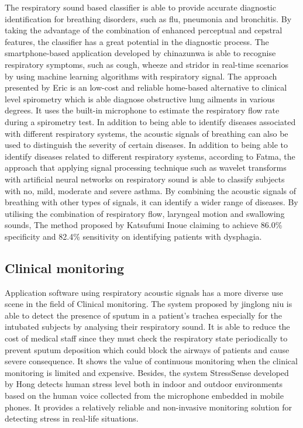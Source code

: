 The respiratory sound based classifier is able to provide accurate diagnostic identification for breathing disorders, such as flu, pneumonia and bronchitis. By taking the advantage of the combination of enhanced perceptual and cepstral features, the classifier has a great potential in the diagnostic process.\cite{Lei2014Content-basedFeatures} The smartphone-based application developed by chinazunwa is able to recognise respiratory symptoms, such as cough, wheeze and stridor in real-time scenarios by using machine learning algorithms with respiratory signal.\cite{Uwaoma2017OnAlgorithms} The approach presented by Eric is an low-cost and reliable home-based alternative to clinical level spirometry which is able diagnose obstructive lung ailments in various degrees. It uses the built-in microphone to estimate the respiratory flow rate during a spirometry test.\cite{Boriello2012SpiroSmart} In addition to being able to identify diseases associated with different respiratory systems, the acoustic signals of breathing can also be used to distinguish the severity of certain diseases. In addition to being able to identify diseases related to different respiratory systems, according to Fatma, the approach that applying signal processing technique such as wavelet transforms with artificial neural networks on respiratory sound is able to classify subjects with no, mild, moderate and severe asthma.\cite{Gogus2015ClassificationNetworks} By combining the acoustic signals of breathing with other types of signals, it can identify a wider range of diseases. By utilising the combination of respiratory flow, laryngeal motion and swallowing sounds, The method proposed by Katsufumi Inoue claiming to achieve 86.0\% specificity and 82.4\% sensitivity on identifying patients with dysphagia.\cite{Oku2018UsingSwallowing}


\subsection{Clinical monitoring}
Application software using respiratory acoustic signals has a more diverse use scene in the field of Clinical monitoring. The system proposed by jinglong niu is able to detect the presence of sputum in a patient’s trachea especially for the intubated subjects by analysing their respiratory sound. It is able to reduce the cost of medical staff since they must check the respiratory state periodically to prevent sputum deposition which could block the airways of patients and cause severe consequence.\cite{Niu2019AState} It shows the value of continuous monitoring when the clinical monitoring is limited and expensive. 
Besides, the system StressSense developed by Hong detects human stress level both in indoor and outdoor environments based on the human voice collected from the microphone embedded in mobile phones. It provides a relatively reliable and non-invasive monitoring solution for detecting stress in real-life situations.\cite{Lu2012StressSense:Smartphones}

